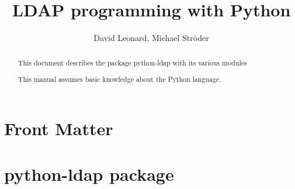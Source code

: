 \documentclass{manual}
\title{LDAP programming with Python}
\author{David Leonard, Michael Str\"oder}
\begin{document}
\maketitle

\ifhtml
\chapter*{Front Matter\label{front}}
\fi

\begin{abstract}
\noindent
This document describes the package python-ldap with its various modules

This manual assumes basic knowledge about the Python language.
\end{abstract}

\tableofcontents

\chapter{python-ldap package}










\renewcommand{\indexname}{Module Index}

\renewcommand{\indexname}{Index}
\end{document}
